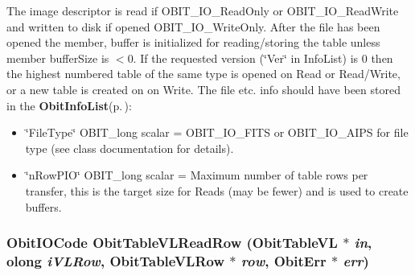 The image descriptor is read if OBIT\_\-IO\_\-Read\-Only or OBIT\_\-IO\_\-Read\-Write and written to disk if opened OBIT\_\-IO\_\-Write\-Only. After the file has been opened the member, buffer is initialized for reading/storing the table unless member buffer\-Size is $<$0. If the requested version (\char`\"{}Ver\char`\"{} in Info\-List) is 0 then the highest numbered table of the same type is opened on Read or Read/Write, or a new table is created on on Write. The file etc. info should have been stored in the {\bf Obit\-Info\-List}{\rm (p.\,\pageref{structObitInfoList})}: \begin{itemize}
\item \char`\"{}File\-Type\char`\"{} OBIT\_\-long scalar = OBIT\_\-IO\_\-FITS or OBIT\_\-IO\_\-AIPS for file type (see class documentation for details). \item \char`\"{}n\-Row\-PIO\char`\"{} OBIT\_\-long scalar = Maximum number of table rows per transfer, this is the target size for Reads (may be fewer) and is used to create buffers. 
\end{itemize}
\subsubsection{\setlength{\rightskip}{0pt plus 5cm}Obit\-IOCode Obit\-Table\-VLRead\-Row ({\bf Obit\-Table\-VL} $\ast$ {\em in}, {\bf olong} {\em i\-VLRow}, {\bf Obit\-Table\-VLRow} $\ast$ {\em row}, {\bf Obit\-Err} $\ast$ {\em err})}\label{ObitTableVL_8h_a18}


